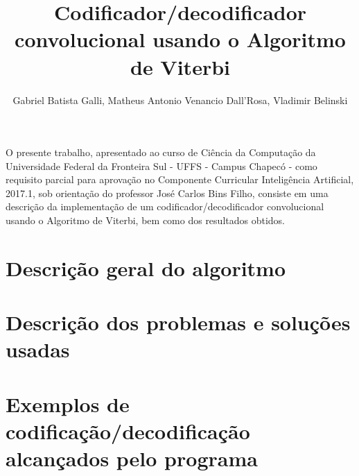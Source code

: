 \documentclass[12pt]{article}
\title{Codificador/decodificador convolucional usando o Algoritmo de Viterbi}
\author{Gabriel Batista Galli\inst{1}, Matheus Antonio Venancio Dall'Rosa\inst{1}, Vladimir Belinski\inst{1}}
\begin{document}
 

\maketitle
     
\begin{resumo} 
  O presente trabalho, apresentado ao curso de Ciência da Computação da Universidade Federal da Fronteira Sul - UFFS - Campus Chapecó - como requisito parcial para aprovação no Componente Curricular Inteligência Artificial, 2017.1, sob orientação do professor José Carlos Bins Filho, consiste em uma descrição da implementação de um codificador/decodificador convolucional usando o Algoritmo de Viterbi, bem como dos resultados obtidos.
\end{resumo}

\section{Descrição geral do algoritmo}
\section{Descrição dos problemas e soluções usadas}
\section{Exemplos de codificação/decodificação alcançados pelo programa}

% 
% 
\end{document}
